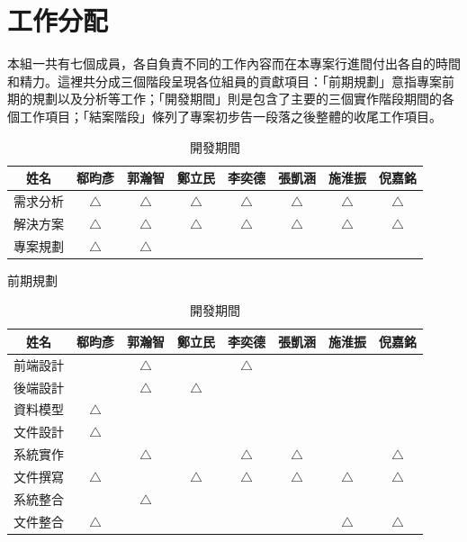 \documentclass[12pt]{article}
\newcommand{\ci}{$\bigtriangleup$}
\begin{document}


\section{工作分配}
本組一共有七個成員，各自負責不同的工作內容而在本專案行進間付出各自的時間和精力。這裡共分成三個階段呈現各位組員的貢獻項目：「前期規劃」意指專案前期的規劃以及分析等工作；「開發期間」則是包含了主要的三個實作階段期間的各個工作項目；「結案階段」條列了專案初步告一段落之後整體的收尾工作項目。

\begin{center}
\begin{table}[!h]
\begin{subtable}{\textwidth}
\begin{tabular}{ | c | c | c | c | c | c | c | c | } \hline
姓名 & 郗昀彥 & 郭瀚智 & 鄭立民 & 李奕德 & 張凱涵 & 施淮振 & 倪嘉銘 \\ \hline \hline
需求分析 & \ci & \ci & \ci & \ci & \ci & \ci & \ci \\ \hline
解決方案 & \ci & \ci & \ci & \ci & \ci & \ci & \ci \\ \hline
專案規劃 & \ci & \ci & & & & & \\ \hline
\end{tabular}
\caption{前期規劃}
\label{charge1}
\end{subtable}
\begin{subtable}{\textwidth}
\begin{tabular}{ | c | c | c | c | c | c | c | c | } \hline
姓名 & 郗昀彥 & 郭瀚智 & 鄭立民 & 李奕德 & 張凱涵 & 施淮振 & 倪嘉銘 \\ \hline \hline
前端設計 & & \ci & & \ci & & & \\ \hline
後端設計 & & \ci & \ci & & & & \\ \hline
資料模型 & \ci & & & & & & \\ \hline
文件設計 & \ci & & & & & & \\ \hline
系統實作 & & \ci & & \ci & \ci & & \ci \\ \hline
文件撰寫 & \ci & & \ci & \ci & \ci & \ci & \ci \\ \hline
系統整合 & & \ci & & & & & \\ \hline
文件整合 & \ci & & & & & \ci & \ci \\ \hline
\end{tabular}
\caption{開發期間}

\end{subtable}
\end{table}
\end{center}
\end{document}
